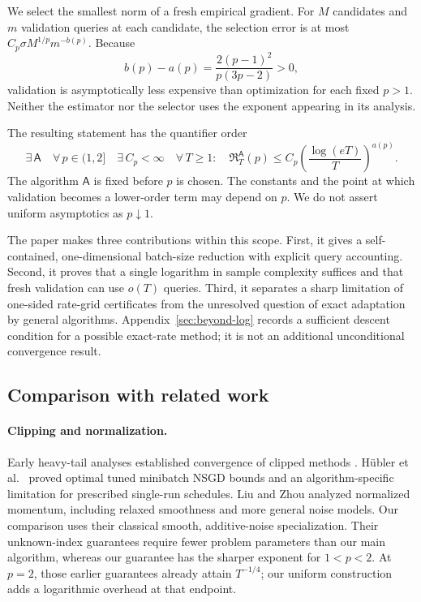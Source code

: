 \documentclass[11pt,a4paper]{article}
\theoremstyle{definition}
\theoremstyle{remark}
\begin{document}
We select the smallest norm of a fresh empirical gradient. For $M$ candidates
and $m$ validation queries at each candidate, the selection error is at most
$C_p\sigma M^{1/p}m^{-b(p)}$. Because
\begin{equation}\label{eq:exponent-gap}
 b(p)-a(p)=\frac{2(p-1)^2}{p(3p-2)}>0,
\end{equation}
validation is asymptotically less expensive than optimization for each fixed
$p>1$. Neither the estimator nor the selector uses the exponent appearing
in its analysis.

The resulting statement has the quantifier order
\[
 \exists\,\mathsf A\quad\forall\,p\in(1,2]\quad
 \exists\,C_p<\infty\quad\forall\,T\ge1:
 \quad\mathfrak R_T^{\mathsf A}(p)
 \le C_p\left(\frac{\log(eT)}{T}\right)^{a(p)}.
\]
The algorithm $\mathsf A$ is fixed before $p$ is chosen. The constants
and the point at which validation becomes a lower-order term may depend
on $p$. We do not assert uniform asymptotics as $p\downarrow1$.

The paper makes three contributions within this scope. First, it gives a
self-contained, one-dimensional batch-size reduction with explicit query
accounting. Second, it proves that a single logarithm in sample complexity
suffices and that fresh validation can use $o(T)$ queries. Third, it
separates a sharp limitation of one-sided rate-grid certificates from the
unresolved question of exact adaptation by general algorithms.
Appendix~\ref{sec:beyond-log} records a sufficient descent condition for
a possible exact-rate method; it is not an additional unconditional
convergence result.

\subsection{Comparison with related work}\label{sec:related}

\paragraph{Clipping and normalization.}
Early heavy-tail analyses established convergence of clipped methods
\cite{zhang2020adaptive,nguyen2023clipped}.
H\"ubler et al.\ \cite{hubler2025normalization} proved optimal tuned
minibatch NSGD bounds and an algorithm-specific limitation for prescribed
single-run schedules. Liu and Zhou \cite{liuzhou2025} analyzed normalized
momentum, including relaxed smoothness and more general noise models.
Our comparison uses their classical smooth, additive-noise specialization.
Their unknown-index guarantees require fewer problem parameters than our
main algorithm, whereas our guarantee has the sharper exponent for
$1<p<2$. At $p=2$, those earlier guarantees already attain $T^{-1/4}$;
our uniform construction adds a logarithmic overhead at that endpoint.
\end{document}

